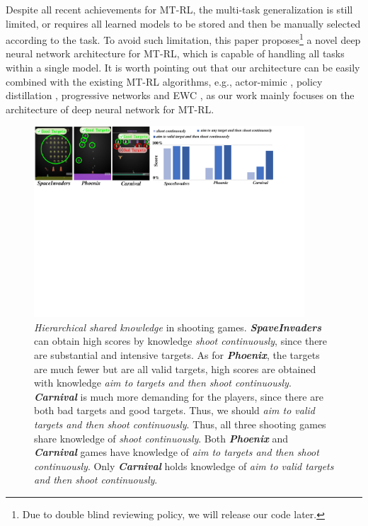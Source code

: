\documentclass[letterpaper]{article} %
\begin{document}
Despite all recent achievements for MT-RL, the multi-task generalization is still limited, or requires all learned models to be stored and then be manually selected according to the task. To avoid such limitation, this paper proposes\footnote{Due to double blind reviewing policy, we will release our code later. } a novel deep neural network architecture for MT-RL, which is capable of handling all tasks within a single model. It is worth pointing out that our architecture can be easily combined with the existing MT-RL algorithms, e.g., actor-mimic \cite{parisotto16_actormimic}, policy distillation \cite{rusu2015policy}, progressive networks \cite{rusu2016progressive} and EWC \cite{kirkpatrick2017overcoming}, as our work mainly focuses on the architecture of deep neural network for MT-RL.
\begin{figure}[htbp]
	\begin{center}
		\centerline{\includegraphics[width=0.9\textwidth]{figure/csfg2}}%
		\caption{\textit{Hierarchical shared knowledge} in shooting games. \textbf{\textit{SpaveInvaders}} can obtain high scores by knowledge \textit{shoot continuously}, since there are substantial and intensive targets. As for \textbf{\textit{Phoenix}}, the targets are much fewer but are all valid targets, high scores are obtained with knowledge \textit{aim to targets and then shoot continuously}. \textbf{\textit{Carnival}} is much more demanding for the players, since there are both bad targets and good targets. Thus, we should \textit{aim to valid targets and then shoot continuously}. Thus, all three shooting games share knowledge of \textit{shoot continuously}. Both \textbf{\textit{Phoenix}} and \textbf{\textit{Carnival}} games have knowledge of \textit{aim to targets and then shoot continuously}. Only \textbf{\textit{Carnival}} holds knowledge of \textit{aim to valid targets and then shoot continuously}.}
		\label{shoot}
	\end{center}
\end{figure}
\end{document}
